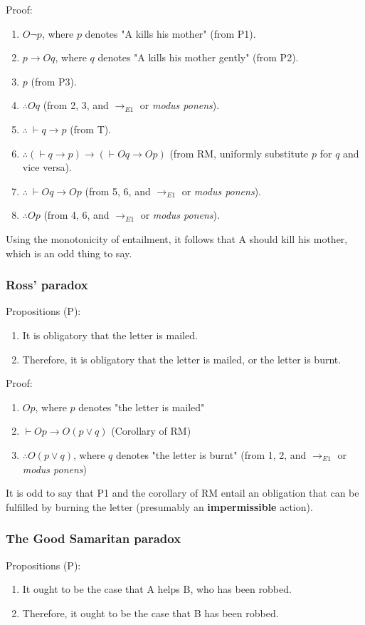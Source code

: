 \documentclass[11pt]{article}
\begin{document}
Proof:
\begin{enumerate}
\item \(O \neg p\), where \(p\) denotes "A kills his mother" (from P1).
\item \(p \rightarrow Oq\), where \(q\) denotes "A kills his mother gently" (from P2).
\item \(p\) (from P3).
\item \(\therefore Oq\) (from 2, 3, and \(\rightarrow_{E1}\) or \emph{modus ponens}).
\item \(\therefore \ \vdash q \rightarrow p\) (from T).
\item \(\therefore (\vdash q \rightarrow p) \rightarrow (\vdash Oq \rightarrow Op)\) (from RM, uniformly substitute \(p\) for \(q\) and vice versa).
\item \(\therefore \ \vdash Oq \rightarrow Op\) (from 5, 6, and \(\rightarrow_{E1}\) or \emph{modus ponens}).
\item \(\therefore Op\) (from 4, 6, and \(\rightarrow_{E1}\) or \emph{modus ponens}).
\end{enumerate}

Using the monotonicity of entailment, it follows that A should kill his mother, which is an odd thing to say.
\subsubsection{Ross' paradox}
\label{sec:org329ee6b}
Propositions (P):
\begin{enumerate}
\item It is obligatory that the letter is mailed.
\item Therefore, it is obligatory that the letter is mailed, or the letter is burnt.
\end{enumerate}

Proof:
\begin{enumerate}
\item \(Op\), where \(p\) denotes "the letter is mailed"
\item \(\vdash Op \rightarrow O(p \vee q)\) (Corollary of RM)
\item \(\therefore O(p \vee q)\), where \(q\) denotes "the letter is burnt" (from 1, 2, and \(\rightarrow_{E1}\) or \emph{modus ponens})
\end{enumerate}

It is odd to say that P1 and the corollary of RM entail an obligation that can be fulfilled by burning the letter (presumably an \textbf{impermissible} action).
\subsubsection{The Good Samaritan paradox}
\label{sec:org8aad76e}
Propositions (P):
\begin{enumerate}
\item It ought to be the case that A helps B, who has been robbed.
\item Therefore, it ought to be the case that B has been robbed.
\end{enumerate}
\end{document}
